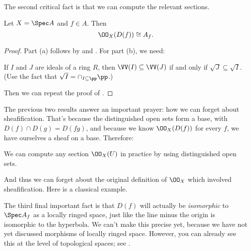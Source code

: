 The second critical fact is that we can compute the relevant sections.
\begin{theorem}
	Let $X = \Spec A$ and $f \in A$.
	Then \[ \OO_X(D(f)) \cong A_f. \]
\end{theorem}
\begin{proof}
	Part (a) follows by 
	and .
	For part (b), we need:
	\begin{ques}
		If $I$ and $J$ are ideals of a ring $R$,
		then $\VV(I) \subseteq \VV(J)$ if and only if
		$\sqrt{J} \subseteq \sqrt{I}$.
		(Use the fact that $\sqrt I = \cap_{I \subseteq \pp} \pp$.)
	\end{ques}
	Then we can repeat the proof of .
\end{proof}

\begin{example}
\end{example}

The previous two results answer an important prayer:
how we can forget about sheafification.
That's because the distinguished open sets form a base,
with $D(f) \cap D(g) = D(fg)$,
and because we know $\OO_X(D(f))$ for every $f$,
we have ourselves a sheaf on a base.
Therefore:
\begin{moral}
	We can compute any section $\OO_X(U)$ in practice
	by using distinguished open sets.
\end{moral}
And thus we can forget about the original definition of $\OO_X$
which involved sheafification.
Here is a classical example.
\begin{example}
\end{example}


The third final important fact is that
$D(f)$ will actually be \emph{isomorphic} to $\Spec A_f$
as a locally ringed space,
just like the line minus the origin is isomorphic to the hyperbola.
We can't make this precise yet,
because we have not yet discussed morphisms of locally ringed space.
However, you can already see this at the level of topological spaces;
see .

